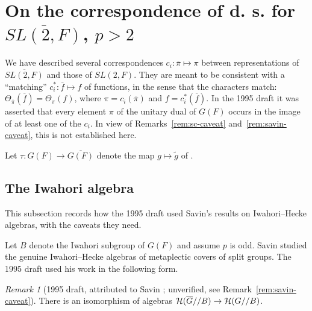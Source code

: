 \documentclass[12pt,letterpaper]{book}
\theoremstyle{plain}
\theoremstyle{definition}
\theoremstyle{remark}
\theoremstyle{remark}
\newtheorem{remyy}{Remark}
\begin{document}





\section{On the correspondence of d. s. for
\texorpdfstring{$\overline{SL(2,F)}$}{SL(2,F)-bar}, \texorpdfstring{$p>2$}{p>2}}\label{sec:padic-ds}

We have described several correspondences
$c_i:\overline{\pi}\longmapsto \pi$
between representations of
$\overline{SL(2,F)}$ and those of $SL(2,F)$. They are meant to be
consistent with a ``matching''
$c_i^*:\overline{f}\longmapsto f$
of functions, in the sense that the characters match:
$\Theta_{\overline{\pi}}(\overline{f})=\Theta_{\pi}(f)$, where
$\pi=c_i(\overline{\pi})$ and $f=c_i^*(\overline{f})$.
In the 1995 draft it was asserted that every element $\pi$ of the
unitary dual of $G(F)$ occurs in the image of at
least one of the $c_i$. In view of Remarks~\ref{rem:sc-caveat}
and~\ref{rem:savin-caveat}, this is not established here.

Let $\tau:G(F)\rightarrow \overline{G(F)}$ denote the map
$g\longmapsto \tilde{g}$ of \cite{Fl}.

\subsection{The Iwahori algebra}

This subsection records how the 1995 draft used Savin's results on Iwahori--Hecke algebras, with the caveats they need.


Let $B$ denote the Iwahori subgroup of $G(F)$ and assume $p$ is odd.
Savin \cite{Sav} studied the genuine Iwahori--Hecke algebras of
metaplectic covers of split groups. The 1995 draft used his work in the
following form.

\begin{remyy}[1995 draft, attributed to Savin \cite{Sav}; unverified, see
Remark~\ref{rem:savin-caveat}]\label{claim:savin} There is an isomorphism
of algebras
${\cal H}(\overline{G}//B)\rightarrow {\cal H}(G//B)$.
\end{remyy}
\end{document}
